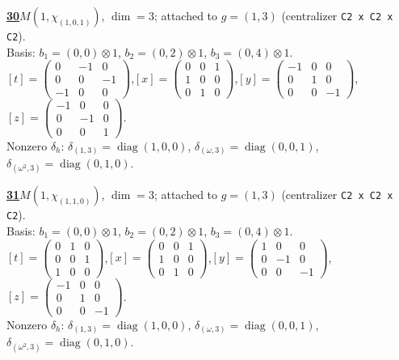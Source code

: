 \begin{samepage}\noindent\textbf{\underline{30}}\quad $M(1,\chi_{(1,0,1)})$, $\dim=3$; attached to $g=(1,3)$ (centralizer \texttt{C2 x C2 x C2}).\\
Basis: $b_{1}=(0,0)\otimes 1$, $b_{2}=(0,2)\otimes 1$, $b_{3}=(0,4)\otimes 1$.\\
$[t]=\left(\begin{smallmatrix} 0 & -1 & 0 \\ 0 & 0 & -1 \\ -1 & 0 & 0 \end{smallmatrix}\right)$,\quad $[x]=\left(\begin{smallmatrix} 0 & 0 & 1 \\ 1 & 0 & 0 \\ 0 & 1 & 0 \end{smallmatrix}\right)$,\quad $[y]=\left(\begin{smallmatrix} -1 & 0 & 0 \\ 0 & 1 & 0 \\ 0 & 0 & -1 \end{smallmatrix}\right)$,\quad $[z]=\left(\begin{smallmatrix} -1 & 0 & 0 \\ 0 & -1 & 0 \\ 0 & 0 & 1 \end{smallmatrix}\right)$.\\
Nonzero $\delta_h$: $\delta_{(1,3)}=\operatorname{diag}(1,0,0)$, $\delta_{(\omega,3)}=\operatorname{diag}(0,0,1)$, $\delta_{(\omega^2,3)}=\operatorname{diag}(0,1,0)$.\end{samepage}
\medskip

\begin{samepage}\noindent\textbf{\underline{31}}\quad $M(1,\chi_{(1,1,0)})$, $\dim=3$; attached to $g=(1,3)$ (centralizer \texttt{C2 x C2 x C2}).\\
Basis: $b_{1}=(0,0)\otimes 1$, $b_{2}=(0,2)\otimes 1$, $b_{3}=(0,4)\otimes 1$.\\
$[t]=\left(\begin{smallmatrix} 0 & 1 & 0 \\ 0 & 0 & 1 \\ 1 & 0 & 0 \end{smallmatrix}\right)$,\quad $[x]=\left(\begin{smallmatrix} 0 & 0 & 1 \\ 1 & 0 & 0 \\ 0 & 1 & 0 \end{smallmatrix}\right)$,\quad $[y]=\left(\begin{smallmatrix} 1 & 0 & 0 \\ 0 & -1 & 0 \\ 0 & 0 & -1 \end{smallmatrix}\right)$,\quad $[z]=\left(\begin{smallmatrix} -1 & 0 & 0 \\ 0 & 1 & 0 \\ 0 & 0 & -1 \end{smallmatrix}\right)$.\\
Nonzero $\delta_h$: $\delta_{(1,3)}=\operatorname{diag}(1,0,0)$, $\delta_{(\omega,3)}=\operatorname{diag}(0,0,1)$, $\delta_{(\omega^2,3)}=\operatorname{diag}(0,1,0)$.\end{samepage}
\medskip

